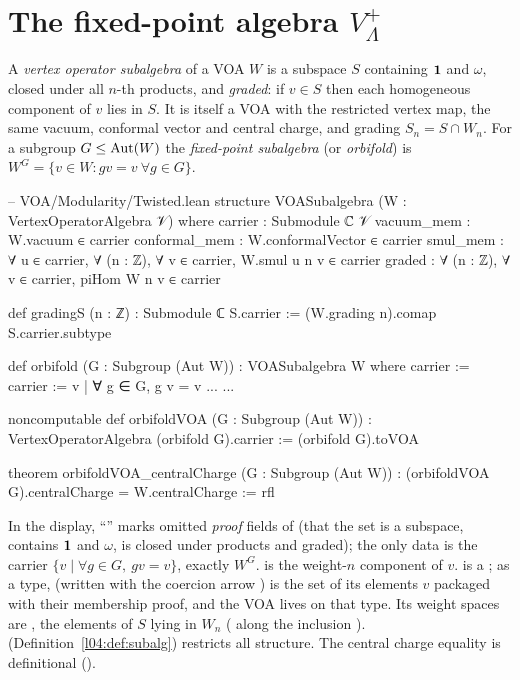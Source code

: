\section{The fixed-point algebra \texorpdfstring{$V_\Lambda^+$}{V+}}\label{ch04:sec:plus}

\begin{definition}\label{ch04:def:orbifold}
A \emph{vertex operator subalgebra} of a VOA $W$ is a subspace $S$ containing $\mathbf{1}$ and
$\omega$, closed under all $n$-th products, and \emph{graded}: if $v\in S$ then each homogeneous
component of $v$ lies in $S$. It is itself a VOA with the restricted vertex map, the same vacuum,
conformal vector and central charge, and grading $S_n=S\cap W_n$. For a subgroup
$G\le\operatorname{Aut}(W)$ the \emph{fixed-point subalgebra} (or \emph{orbifold}) is
$W^G=\{v\in W: gv=v\ \forall g\in G\}$.
\end{definition}

\begin{leancode}
-- VOA/Modularity/Twisted.lean
structure VOASubalgebra (W : VertexOperatorAlgebra 𝒱) where
  carrier : Submodule ℂ 𝒱
  vacuum_mem : W.vacuum ∈ carrier
  conformal_mem : W.conformalVector ∈ carrier
  smul_mem : ∀ u ∈ carrier, ∀ (n : ℤ), ∀ v ∈ carrier, W.smul u n v ∈ carrier
  graded : ∀ (n : ℤ), ∀ v ∈ carrier, piHom W n v ∈ carrier

def gradingS (n : ℤ) : Submodule ℂ S.carrier := (W.grading n).comap S.carrier.subtype

def orbifold (G : Subgroup (Aut W)) : VOASubalgebra W where
  carrier :=
    { carrier := {v | ∀ g ∈ G, g v = v}
      ... }
  ...

noncomputable def orbifoldVOA (G : Subgroup (Aut W)) :
    VertexOperatorAlgebra (orbifold G).carrier :=
  (orbifold G).toVOA

theorem orbifoldVOA_centralCharge (G : Subgroup (Aut W)) :
    (orbifoldVOA G).centralCharge = W.centralCharge := rfl
\end{leancode}

\begin{dictionary}
In the display, ``'' marks omitted \emph{proof} fields of  (that the set
is a subspace, contains $\mathbf{1}$ and $\omega$, is closed under products and graded); the only data
is the carrier $\{v\mid\forall g\in G,\ gv=v\}$, exactly $W^G$.  is the
weight-$n$ component of $v$.  is a ; as a type,
 (written with the coercion arrow ) is the set of its elements
$v$ packaged with their membership proof, and the VOA  lives on that type. Its
weight spaces are , the elements of $S$ lying in $W_n$ ( along the
inclusion ).  (Definition~\ref{l04:def:subalg}) restricts all structure. The central
charge equality is definitional ().
\end{dictionary}

